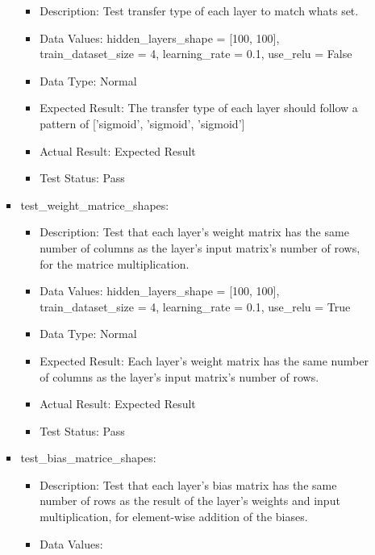 \documentclass[./project-report/src/latex/project-report.tex]{subfiles}
\begin{document}
\begin{itemize}
\begin{itemize}
\begin{itemize}
\begin{itemize}
						\item Description: Test transfer type of each layer to match whats set.
						\item Data Values: \newline
							hidden\_layers\_shape = [100, 100], \newline
                        	train\_dataset\_size = 4, \newline
                            learning\_rate = 0.1, \newline
                            use\_relu = False
						\item Data Type: Normal
						\item Expected Result: The transfer type of each layer should follow a pattern of ['sigmoid', 'sigmoid', 'sigmoid']
						\item Actual Result: Expected Result
						\item Test Status: Pass
					\end{itemize}
					\item test\_weight\_matrice\_shapes:
					\begin{itemize}
						\item Description: Test that each layer's weight matrix has the same number of columns as the layer's input matrix's number of rows, for the matrice multiplication.
						\item Data Values: \newline
							hidden\_layers\_shape = [100, 100], \newline
							train\_dataset\_size = 4, \newline
							learning\_rate = 0.1, \newline
							use\_relu = True
						\item Data Type: Normal
						\item Expected Result: Each layer's weight matrix has the same number of columns as the layer's input matrix's number of rows.
						\item Actual Result: Expected Result
						\item Test Status: Pass
					\end{itemize}
					\item test\_bias\_matrice\_shapes:
					\begin{itemize}
						\item Description: Test that each layer's bias matrix has the same number of rows as the result of the layer's weights and input multiplication, for element-wise addition of the 
							  biases.
						\item Data Values: \newline

\end{itemize}
\end{itemize}
\end{itemize}
\end{itemize}
\end{document}
